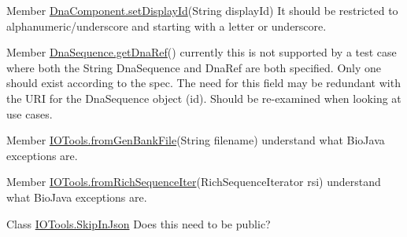 \label{todo__todo000001}
\hypertarget{todo__todo000001}{}
 
\begin{DoxyDescription}
\item[Member \hyperlink{classorg_1_1sbolstandard_1_1lib_s_b_o_lj_1_1_dna_component_a46b93a70e7bd612a7b429aac4829bc88}{DnaComponent.setDisplayId}(String displayId) ]It should be restricted to alphanumeric/underscore and starting with a letter or underscore. 
\end{DoxyDescription}

\label{todo__todo000002}
\hypertarget{todo__todo000002}{}
 
\begin{DoxyDescription}
\item[Member \hyperlink{classorg_1_1sbolstandard_1_1lib_s_b_o_lj_1_1_dna_sequence_aa65410fe45bf6277117ef6a880e6ddce}{DnaSequence.getDnaRef}() ]currently this is not supported by a test case where both the String DnaSequence and DnaRef are both specified. Only one should exist according to the spec. The need for this field may be redundant with the URI for the DnaSequence object (id). Should be re-\/examined when looking at use cases. 
\end{DoxyDescription}

\label{todo__todo000003}
\hypertarget{todo__todo000003}{}
 
\begin{DoxyDescription}
\item[Member \hyperlink{classorg_1_1sbolstandard_1_1lib_s_b_o_lj_1_1_i_o_tools_ab30e7fc9ccb218e864e45cad4366304a}{IOTools.fromGenBankFile}(String filename) ]understand what BioJava exceptions are. 
\end{DoxyDescription}

\label{todo__todo000004}
\hypertarget{todo__todo000004}{}
 
\begin{DoxyDescription}
\item[Member \hyperlink{classorg_1_1sbolstandard_1_1lib_s_b_o_lj_1_1_i_o_tools_a375e674a9edc77307e250df41d76f02d}{IOTools.fromRichSequenceIter}(RichSequenceIterator rsi) ]understand what BioJava exceptions are. 
\end{DoxyDescription}

\label{todo__todo000005}
\hypertarget{todo__todo000005}{}
 
\begin{DoxyDescription}
\item[Class \hyperlink{interfaceorg_1_1sbolstandard_1_1lib_s_b_o_lj_1_1_i_o_tools_1_1_skip_in_json}{IOTools.SkipInJson} ]Does this need to be public?
\end{DoxyDescription}

